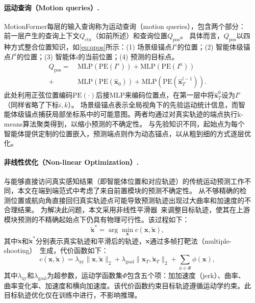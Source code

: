 \documentclass[10pt,twocolumn,letterpaper]{article}
\begin{document}
\paragraph{运动查询（Motion queries）.} MotionFormer每层的输入查询称为运动查询（motion queries），包含两个部分：前一层产生的查询上下文$Q_{\text{ctx}}$（如前所述）和查询位置$Q_{\text{pos}}$。
%
具体而言，$Q_{\text{pos}}$以四种方式整合位置知识，如\cref{eq:qpos}所示：(1) 场景级锚点$I^s$的位置；(2) 智能体级锚点$I^a$的位置；(3) 智能体$i$的当前位置；(4) 预测的目标点。
%
\begin{equation}
\label{eq:qpos}
\begin{aligned}
    Q_{\text{pos}} =\ &\text{MLP}(\text{PE}(I^s))  + \text{MLP}(\text{PE}(I^a))  \\
    +\ &\text{MLP}(\text{PE}(\hat{\mathbf{x}}_0)) + \text{MLP}(\text{PE}(\hat{\mathbf{x}}_T^{l-1})).
\end{aligned}
\end{equation}
此处利用正弦位置编码$\text{PE}(\cdot)$后接MLP来编码位置点，在第一层中将$\hat{\mathbf{x}}_T^0$设为$I^s$（同样省略了下标$i,k$）。
%
场景级锚点表示全局视角下的先验运动统计信息，而智能体级锚点捕获局部坐标系中的可能意图。两者均通过对真实轨迹的端点执行k-means算法聚类得到，以缩小预测的不确定性。
%
与先验知识不同，起始点为每个智能体提供定制的位置嵌入，预测端点则作为动态锚点，以从粗到细的方式逐层优化。


\paragraph{非线性优化（Non-linear Optimization）.}
与能够直接访问真实感知结果（即智能体位置和对应轨迹）的传统运动预测工作不同，本文在端到端范式中考虑了来自前置模块的预测不确定性。
%
从不够精确的检测位置或航向角直接回归真实轨迹点可能导致预测轨迹出现过大曲率和加速度的不合理结果。
%
为解决此问题，本文采用非线性平滑器~\cite{nuplan}来调整目标轨迹，使其在上游模块预测的不精确起始点下仍具有物理可行性。该过程如下：
\begin{equation}
\label{eq:non-linear-argmin}
    \tilde{\mathbf{x}}^* = \arg \min _{\mathbf{x}} c(\mathbf{x}, \tilde{\mathbf{x}} ),
\end{equation}
%
其中$\tilde{\mathbf{x}}$和$\tilde{\mathbf{x}}^*$分别表示真实轨迹和平滑后的轨迹，$\mathbf{x}$通过多帧打靶法（multiple-shooting）~\cite{bock1984multiple}生成，代价函数如下：
%
\begin{equation}
\label{eq:non-linear-cost}
    c(\mathbf{x}, \tilde{\mathbf{x}} ) = \lambda_{\text{xy}} \lVert\mathbf{x}, \tilde{\mathbf{x}}\rVert_2 +  \lambda_{\text{goal}} \lVert\mathbf{x}_{T}, \tilde{\mathbf{x}}_{T}\rVert_2
    +  \sum_{\phi\in \Phi} \phi(\mathbf{x}),
\end{equation}
其中$\lambda_{\text{xy}}$和$\lambda_{\text{goal}}$为超参数，运动学函数集$\Phi$包含五个项：加加速度（jerk）、曲率、曲率变化率、加速度和横向加速度。该代价函数约束目标轨迹遵循运动学约束。此目标轨迹优化仅在训练中进行，不影响推理。
\end{document}
